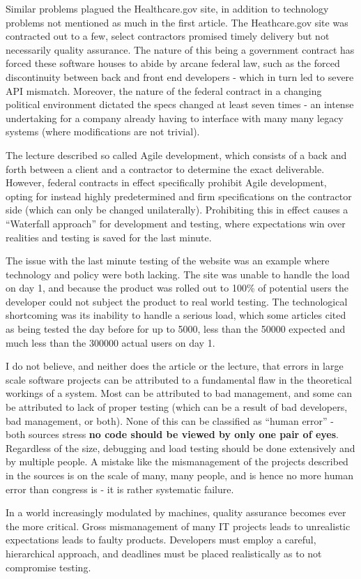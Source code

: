 	Similar problems plagued the Healthcare.gov site, in addition to technology problems not mentioned as much in the first article. The Heathcare.gov site was contracted out to a few, select contractors promised timely delivery but not necessarily quality assurance. The nature of this being a government contract has forced these software houses to abide by arcane federal law, such as the forced discontinuity between back and front end developers - which in turn led to severe API mismatch. Moreover, the nature of the federal contract in a changing political environment dictated the specs changed at least seven times - an intense undertaking for a company already having to interface with many many legacy systems (where modifications are not trivial).

	The lecture described so called Agile development, which consists of a back and forth between a client and a contractor to determine the exact deliverable. However, federal contracts in effect specifically prohibit Agile development, opting for instead highly predetermined and firm specifications on the contractor side (which can only be changed unilaterally). Prohibiting this in effect causes a ``Waterfall approach'' for development and testing, where expectations win over realities and testing is saved for the last minute.

	The issue with the last minute testing of the website was an example where technology and policy were both lacking. The site was unable to handle the load on day 1, and because the product was rolled out to 100\% of potential users the developer could not subject the product to real world testing. The technological shortcoming was its inability to handle a serious load, which some articles cited as being tested the day before for up to 5000, less than the 50000 expected and much less than the 300000 actual users on day 1.

	I do not believe, and neither does the article or the lecture, that errors in large scale software projects can be attributed to a fundamental flaw in the theoretical workings of a system. Most can be attributed to bad management, and some can be attributed to lack of proper testing (which can be a result of bad developers, bad management, or both). None of this can be classified as ``human error'' - both sources stress \textbf{no code should be viewed by only one pair of eyes}. Regardless of the size, debugging and load testing should be done extensively and by multiple people. A mistake like the mismanagement of the projects described in the sources is on the scale of many, many people, and is hence no more human error than congress is - it is rather systematic failure.

	In a world increasingly modulated by machines, quality assurance becomes ever the more critical. Gross mismanagement of many IT projects leads to unrealistic expectations leads to faulty products. Developers must employ a careful, hierarchical approach, and deadlines must be placed realistically as to not compromise testing.


